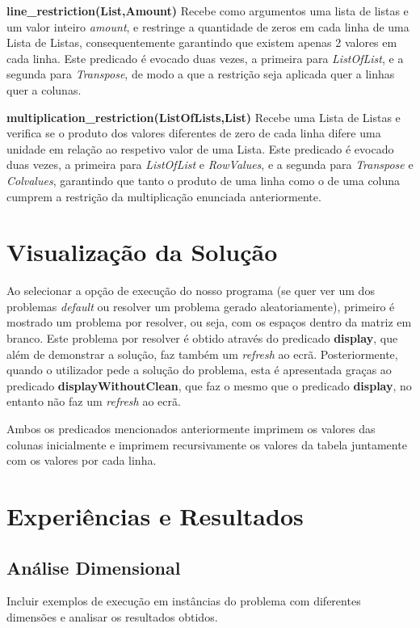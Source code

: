 \documentclass[11pt]{article}
\begin{document}
\bigskip

\textbf{line\_restriction(List,Amount)} Recebe como argumentos uma lista de listas e um valor inteiro \emph{amount}, e restringe a quantidade de zeros em cada linha de uma Lista de Listas, consequentemente garantindo que existem apenas 2 valores em cada linha. Este predicado é evocado duas vezes, a primeira para \emph{ListOfList}, e a segunda para \emph{Transpose}, de modo a que a restrição seja aplicada quer a linhas quer a colunas.

\bigskip

\textbf{multiplication\_restriction(ListOfLists,List)} Recebe uma Lista de Listas e verifica se o produto dos valores diferentes de zero de cada linha difere uma unidade em relação ao respetivo valor de uma Lista. Este predicado é evocado duas vezes, a primeira para \emph{ListOfList} e \emph{RowValues}, e a segunda para \emph{Transpose} e \emph{Colvalues}, garantindo que tanto o produto de uma linha como o de uma coluna cumprem a restrição da multiplicação enunciada anteriormente.


\section{Visualização da Solução}

Ao selecionar a opção de execução do nosso programa (se quer ver um dos problemas 
\textit{default} ou resolver um problema gerado aleatoriamente), primeiro é 
mostrado um problema por resolver, ou seja, com os espaços dentro da matriz em branco.
Este problema por resolver é obtido através do predicado \textbf{display}, que além
de demonstrar a solução, faz também um \textit{refresh} ao ecrã.
Posteriormente, quando o utilizador pede a solução do problema, esta é apresentada graças
ao predicado \textbf{displayWithoutClean}, que faz o mesmo que o predicado \textbf{display},
no entanto não faz um \textit{refresh} ao ecrã.

Ambos os predicados mencionados anteriormente imprimem os valores das colunas inicialmente
e imprimem recursivamente os valores da tabela juntamente com os valores por cada linha.

\section{Experiências e Resultados}

\subsection{Análise Dimensional} Incluir exemplos de execução em instâncias do problema com
diferentes dimensões e analisar os resultados obtidos.
\end{document}
